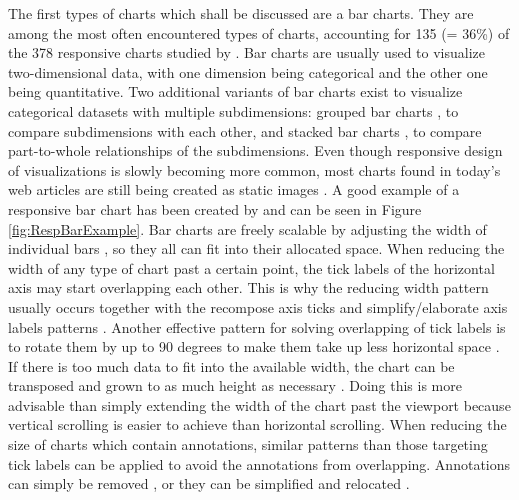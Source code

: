 The first types of charts which shall be discussed are a bar charts. They are among the most often encountered types of charts, accounting for 135 (= 36\%) of the 378 responsive charts studied by \cite{DesignPatternsTradeOffsRespVis}. Bar charts are usually used to visualize two-dimensional data, with one dimension being categorical and the other one being quantitative. Two additional variants of bar charts exist to visualize categorical datasets with multiple subdimensions: grouped bar charts \parencite{GroupedBar}, to compare subdimensions with each other, and stacked bar charts \parencite{StackedBar}, to compare part-to-whole relationships of the subdimensions. Even though responsive design of visualizations is slowly becoming more common, most charts found in today's web articles are still being created as static images \parencite{HBar,VBar,HVBar,MapBarLine}. A good example of a responsive bar chart has been created by \cite{RespVis} and can be seen in Figure \ref{fig:RespBarExample}. Bar charts are freely scalable by adjusting the width of individual bars \parencite{RespHBar,RespHBarHLine,RespHBars}, so they all can fit into their allocated space. When reducing the width of any type of chart past a certain point, the tick labels of the horizontal axis may start overlapping each other. This is why the reducing width pattern usually occurs together with the recompose axis ticks and simplify/elaborate axis labels patterns \parencite{RespHBars,RespHBarHLine,RespVBar}. Another effective pattern for solving overlapping of tick labels is to rotate them by up to 90 degrees to make them take up less horizontal space \parencite{RespVis}. If there is too much data to fit into the available width, the chart can be transposed and grown to as much height as necessary \parencite{RespVis}. Doing this is more advisable than simply extending the width of the chart past the viewport because vertical scrolling is easier to achieve than horizontal scrolling. When reducing the size of charts which contain annotations, similar patterns than those targeting tick labels can be applied to avoid the annotations from overlapping. Annotations can simply be removed \parencite{RespHStackedBar,RespHLineHStackedBar}, or they can be simplified and relocated \parencite{RespVBar}.

